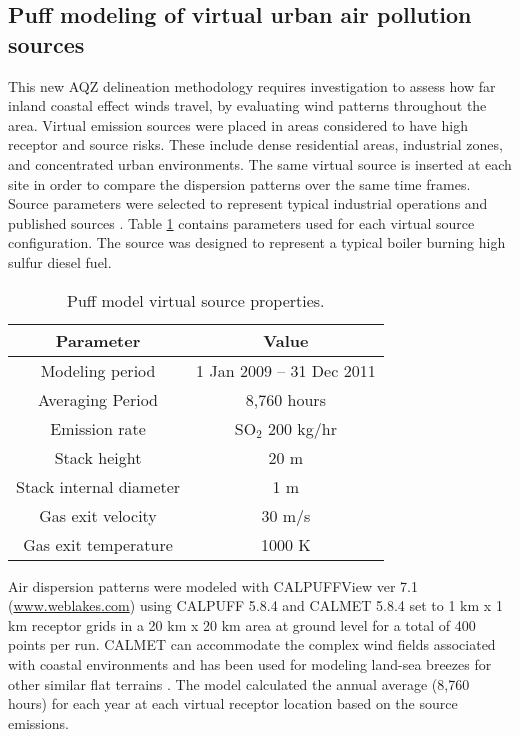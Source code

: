 \subsection{Puff modeling of virtual urban air pollution sources}

This new AQZ delineation methodology requires investigation to assess how far inland coastal effect winds travel, by evaluating wind patterns throughout the area.  Virtual emission sources were placed in areas considered to have high receptor and source risks.  These include dense residential areas, industrial zones, and concentrated urban environments.  The same virtual source is inserted at each site in order to compare the dispersion patterns over the same time frames. Source parameters were selected to represent typical industrial operations and published sources \citep{Chusai2012}. Table \ref{tb:puffmodel} contains parameters used for each virtual source configuration.  The source was designed to represent a typical boiler burning high sulfur diesel fuel.

\begin{table}[H]
\centering
\caption{Puff model virtual source properties.}
\label{tb:puffmodel}
\begin{tabular}{@{}cc@{}}
\toprule
\textbf{Parameter}      & \textbf{Value}           \\ \midrule
Modeling period         & 1 Jan 2009 – 31 Dec 2011 \\
Averaging Period        & 8,760 hours              \\
Emission rate           & SO$_{2}$ 200 kg/hr       \\
Stack height            & 20 m                     \\
Stack internal diameter & 1 m                      \\
Gas exit velocity       & 30 m/s                   \\
Gas exit temperature    & 1000 K                   \\ \bottomrule
\end{tabular}
\end{table}

Air dispersion patterns were modeled with CALPUFFView ver 7.1 (\url{www.weblakes.com}) using CALPUFF 5.8.4 and CALMET 5.8.4  \citep{USEPA2014} set to 1 km x 1 km receptor grids in a 20 km x 20 km area at ground level for a total of 400 points per run.  CALMET can accommodate the complex wind fields associated with coastal environments and has been used for modeling land-sea breezes for other similar flat terrains \citep{Mangia2010}. The model calculated the annual average (8,760 hours) for each year at each virtual receptor location based on the source emissions. 

